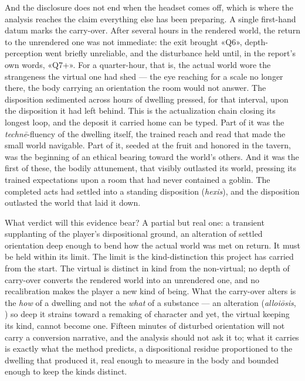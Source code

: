 And the disclosure does not end when the headset comes off, which is where the analysis reaches the claim everything else has been preparing. A single first-hand datum marks the carry-over. After several hours in the rendered world, the return to the unrendered one was not immediate: the exit brought «Q6», depth-perception went briefly unreliable, and the disturbance held until, in the report's own words, «Q7+». For a quarter-hour, that is, the actual world wore the strangeness the virtual one had shed — the eye reaching for a scale no longer there, the body carrying an orientation the room would not answer. The disposition sedimented across hours of dwelling pressed, for that interval, upon the disposition it had left behind. This is the actualization chain closing its longest loop, and the deposit it carried home can be typed. Part of it was the \textit{technē}-fluency of the dwelling itself, the trained reach and read that made the small world navigable. Part of it, seeded at the fruit and honored in the tavern, was the beginning of an ethical bearing toward the world's others. And it was the first of these, the bodily attunement, that visibly outlasted its world, pressing its trained expectations upon a room that had never contained a goblin. The completed acts had settled into a standing disposition (\textit{hexis}), and the disposition outlasted the world that laid it down.

What verdict will this evidence bear? A partial but real one: a transient supplanting of the player's dispositional ground, an alteration of settled orientation deep enough to bend how the actual world was met on return. It must be held within its limit. The limit is the kind-distinction this project has carried from the start. The virtual is distinct in kind from the non-virtual; no depth of carry-over converts the rendered world into an unrendered one, and no recalibration makes the player a new kind of being. What the carry-over alters is the \textit{how} of a dwelling and not the \textit{what} of a substance — an alteration (\textit{alloiōsis}, ) so deep it strains toward a remaking of character and yet, the virtual keeping its kind, cannot become one. Fifteen minutes of disturbed orientation will not carry a conversion narrative, and the analysis should not ask it to; what it carries is exactly what the method predicts, a dispositional residue proportioned to the dwelling that produced it, real enough to measure in the body and bounded enough to keep the kinds distinct.

